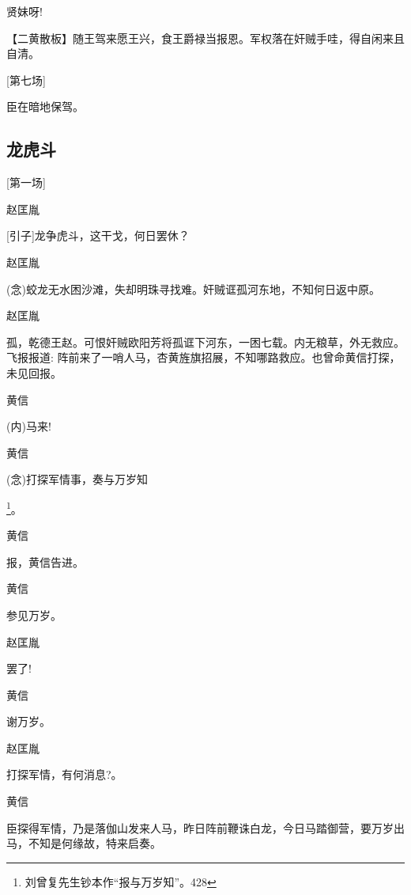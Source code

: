 {贤妹呀!}

\setlength{\hangindent}{60pt} {【{\akai 二黄散板}】随王驾来愿王兴，食王爵禄当报恩。军权落在奸贼手哇，得自闲来且自清。}

{{[}第七场{]}}

{臣在暗地保驾。}

\newpage

\hypertarget{ux9f99ux864eux6597}{%

\subsection{龙虎斗}\label{ux9f99ux864eux6597}}

{{[}第一场{]}}

{赵匡胤\hspace{20pt}~

{[}{\akai 引子}{]}龙争虎斗，这干戈，何日罢休？}

{赵匡胤

({\akai 念})蛟龙无水困沙滩，失却明珠寻找难。奸贼诓孤河东地，不知何日返中原。}

{赵匡胤

孤，乾德王赵。可恨奸贼欧阳芳将孤诓下河东，一困七载。内无粮草，外无救应。飞报报道: 阵前来了一哨人马，杏黄旌旗招展，不知哪路救应。也曾命黄信打探，未见回报。}

{黄信\hspace{30pt}~

({\akai 内})马来!}

{黄信

({\akai 念})打探军情事，奏与万岁知}\footnote{ 刘曾复先生钞本作``报与万岁知''。{428}}{。}

{黄信\hspace{30pt}~

报，黄信告进。}

{黄信\hspace{30pt}~

参见万岁。}

{赵匡胤\hspace{20pt}~

罢了!}

黄信\hspace{30pt}~

谢万岁。

{赵匡胤\hspace{20pt}~

打探军情，有何消息?。}

{黄信

臣探得军情，乃是落伽山发来人马，昨日阵前鞭诛白龙，今日马踏御营，要万岁出马，不知是何缘故，特来启奏。}

